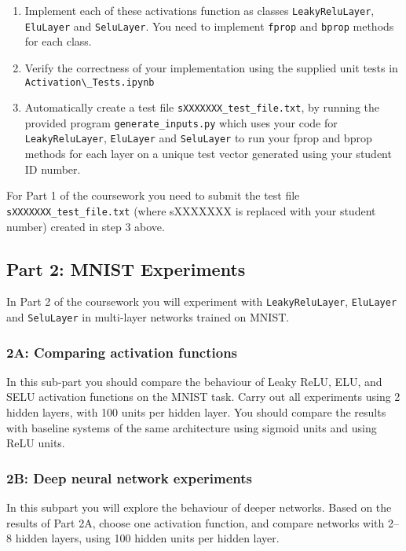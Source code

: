 \documentclass[11pt,]{article}
\begin{document}
\begin{enumerate}
  \item Implement each of these activations function as classes \verb+LeakyReluLayer+, \verb+EluLayer+ and \verb+SeluLayer+.  You need to implement \verb+fprop+ and \verb+bprop+ methods for each class.
  \item Verify the correctness of your implementation using the supplied unit tests in \verb+Activation\_Tests.ipynb+
  \item Automatically create a test file \verb+sXXXXXXX_test_file.txt+, by running the provided program \verb+generate_inputs.py+ which uses your code for  \verb+LeakyReluLayer+, \verb+EluLayer+ and \verb+SeluLayer+ to run your fprop and bprop methods for each layer on a unique test vector generated using your student ID number.
\end{enumerate}

For Part 1 of the coursework you need to submit the test file \verb+sXXXXXXX_test_file.txt+ (where sXXXXXXX is replaced with your student number) created in step 3 above.

\subsection{Part 2: MNIST Experiments}
\label{sec:expts}
In  Part 2 of the coursework you will experiment with \verb+LeakyReluLayer+, \verb+EluLayer+ and \verb+SeluLayer+ in multi-layer networks trained on MNIST.

\subsubsection{2A:  Comparing activation functions}
In this sub-part you should compare the behaviour of Leaky ReLU, ELU, and SELU activation functions on the MNIST task.  Carry out all experiments using 2 hidden layers, with 100 units per hidden layer.  You should compare the results with baseline systems of the same architecture using sigmoid units and using ReLU units.  

\subsubsection{2B: Deep neural network experiments}
In this subpart you will explore the behaviour of deeper networks.  Based on the results of Part 2A, choose one activation function, and compare networks with 2--8 hidden layers, using 100 hidden units per hidden layer.  
\end{document}
